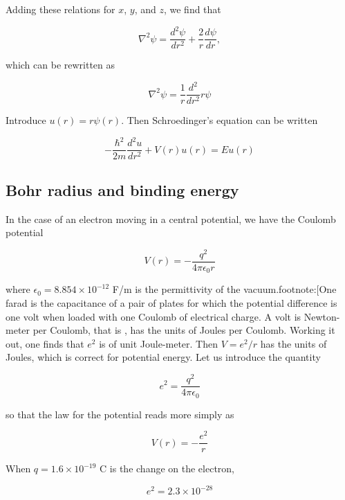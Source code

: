 Adding these relations for $x$, $y$, and $z$, we find that

\begin{equation}
\nabla^2 \psi = \frac{ d^2\psi  }{ dr^2 }+ \frac{2}{r}\frac{d\psi}{dr} ,
\end{equation}

which can be rewritten as

\begin{equation}
\nabla^2 \psi = \frac{1}{r}\frac{ d^2 }{ dr^2 }r\psi
\end{equation}

Introduce $u(r) = r\psi(r)$.  Then Schroedinger's equation can be written

\begin{equation}
-\frac{\hbar^2}{2m} \frac{ d^2u }{ dr^2 } + V(r)u(r) = Eu(r)
\end{equation}

\subsection{Bohr radius and binding energy}

In the case of an electron moving in a central potential, we
have the Coulomb potential

\begin{equation}
V(r) = -\frac{q^2}{4\pi \epsilon_0 r}
\end{equation}

where $\epsilon_0 = 8.854\times 10^{-12}$ F/m is the permittivity of the vacuum.footnote:[One farad is the capacitance of a pair of plates for which the potential difference is one volt when loaded with one Coulomb of electrical charge.  A volt is Newton-meter per Coulomb, that is , has the units of Joules per Coulomb.  Working it out, one finds that $e^2$ is of unit Joule-meter.  Then $V = e^2/r$ has the units of Joules, which is correct for  potential energy.  Let us introduce the quantity

\begin{equation}
e^2 = \frac{q^2}{4\pi\epsilon_0}
\end{equation}

so that the law for the potential reads more simply as

\begin{equation}
V(r) = -\frac{e^2}{r}
\end{equation}

When $q = 1.6\times10^{-19}$ C is the change on the electron,

\begin{equation}
e^2 = 2.3\times10^{-28}
\end{equation}

